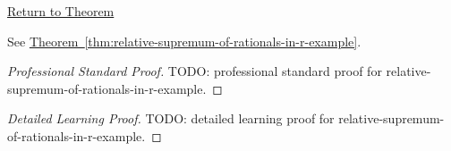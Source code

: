 \newpage
{}
\label{prf:relative-supremum-of-rationals-in-r-example}

\begin{remark*}[Return]
\hyperref[thm:relative-supremum-of-rationals-in-r-example]{Return to Theorem}
\end{remark*}

\begin{theorem*}
See \hyperref[thm:relative-supremum-of-rationals-in-r-example]{Theorem~\ref*{thm:relative-supremum-of-rationals-in-r-example}}.
\end{theorem*}

\begin{proof}[Professional Standard Proof]
\LRAProofBodyStart
TODO: professional standard proof for relative-supremum-of-rationals-in-r-example.
\end{proof}

\begin{proof}[Detailed Learning Proof]
\LRAProofBodyStart
TODO: detailed learning proof for relative-supremum-of-rationals-in-r-example.
\end{proof}

\begin{remark*}
\end{remark*}

\begin{dependencies}
\NoLocalDependencies
\end{dependencies}

\clearpage
